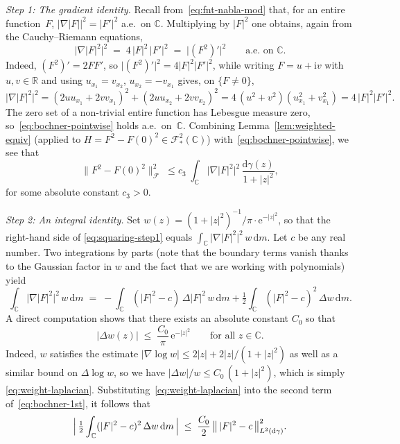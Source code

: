 \documentclass[11pt]{amsart}
\theoremstyle{remark}
\newcommand{\C}{\mathbb{C}}
\newcommand{\abs}[1]{\lvert #1 \rvert}
\newcommand{\norm}[1]{\lVert #1 \rVert}
\newcommand{\dd}{\mathrm{d}}
\newcommand{\ee}{\mathrm{e}}
\newcommand{\ii}{\mathrm{i}}
\begin{document}
\medskip
\noindent\emph{Step 1: The gradient identity.}\;
Recall from~\eqref{eq:fnt-nabla-mod} that, for an entire function~$F$,
$\abs{\nabla \abs{F}}^2 = \abs{F'}^2$ a.e.\ on $\C$. Multiplying by
$\abs{F}^2$ one obtains, again from the Cauchy--Riemann
equations,
\begin{equation}\label{eq:bochner-pointwise}
\abs{\nabla \abs{F}^2}^2
\;=\;
4\, \abs{F}^2\, \abs{F'}^2
\;=\;
\abs{(F^2)'}^2
\qquad\text{a.e.\ on } \C.
\end{equation}
Indeed, $(F^2)' = 2F F'$, so $\abs{(F^2)'}^2 = 4\abs{F}^2 \abs{F'}^2$, while
writing $F = u + \ii v$ with $u,v \in \mathbb{R}$ and using
$u_{x_1} = v_{x_2}$, $u_{x_2} = -v_{x_1}$ gives, on $\{F \neq 0\}$,
\[
\abs{\nabla \abs{F}^2}^2
= (2 u u_{x_1} + 2 v v_{x_1})^2
+ (2 u u_{x_2} + 2 v v_{x_2})^2
= 4\,(u^2+v^2)(u_{x_1}^2 + v_{x_1}^2)
= 4\,\abs{F}^2 \abs{F'}^2.
\]
The zero set of a non-trivial entire function has Lebesgue measure zero,
so~\eqref{eq:bochner-pointwise} holds a.e.\ on~$\C$. Combining
Lemma~\ref{lem:weighted-equiv} (applied to $H = F^2 - F(0)^2 \in
\mathcal{F}^2_\ast(\C)$) with~\eqref{eq:bochner-pointwise}, we see that
\begin{equation}\label{eq:squaring-step1}
\norm{F^2 - F(0)^2}_{\mathcal{F}}^2
\;\le c_3\;
\int_{\C} \abs{\nabla \abs{F}^2}^2\, \frac{\dd\gamma(z)}{1+\abs{z}^2},
\end{equation}
for some absolute constant $c_3 > 0.$

\medskip

\noindent\emph{Step 2: An integral identity.}\;
Set $w(z) = (1+\abs{z}^2)^{-1}/\pi \cdot \ee^{-\abs{z}^2}$, so that the
right-hand side of \eqref{eq:squaring-step1} equals
$\int_{\C}\abs{\nabla\abs{F}^2}^2\, w\,\dd m$. Let $c$ be any real number. Two integrations by parts (note that the boundary terms vanish thanks to the Gaussian
factor in $w$ and the fact that we are working with polynomials) yield
\begin{equation}\label{eq:bochner-1st}
\int_{\C} \abs{\nabla \abs{F}^2}^2\, w\, \dd m
\;=\;
-\int_{\C} (\abs{F}^2 - c)\, \Delta\abs{F}^2\, w\, \dd m
+ \tfrac{1}{2} \int_{\C} (\abs{F}^2 - c)^2\, \Delta w\, \dd m.
\end{equation}
A direct computation shows that there exists an absolute constant $C_0$
so that
\begin{equation}\label{eq:weight-laplacian}
\abs{\Delta w(z)}
\;\le\;
\frac{C_0}{\pi}\, \ee^{-\abs{z}^2}
\qquad\text{for all } z \in \C.
\end{equation}
Indeed, $w$ satisfies the estimate
$\abs{\nabla \log w} \le 2\abs{z} + 2\abs{z}/(1+\abs{z}^2)$ as well as a similar
bound on $\Delta\log w$, so we have
$\abs{\Delta w}/w \le C_0\,(1 + \abs{z}^2)$, which is simply
\eqref{eq:weight-laplacian}.
Substituting~\eqref{eq:weight-laplacian} into the second term
of~\eqref{eq:bochner-1st}, it follows that
\begin{equation}\label{eq:bochner-1st-2nd-term}
\Bigl|\, \tfrac{1}{2}\int_{\C} (\abs{F}^2 - c)^2\, \Delta w\, \dd m \,\Bigr|
\;\le\;
\frac{C_0}{2}\, \bigl\|\, \abs{F}^2 - c \,\bigr\|_{L^2(\dd\gamma)}^2.
\end{equation}
\end{document}
